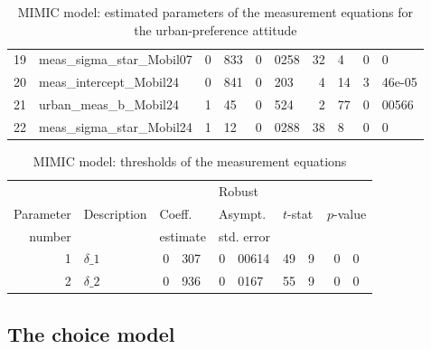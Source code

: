 \documentclass[12pt,a4paper]{article}
\begin{document}
\begin{table}[htb]
\begin{center}
\begin{tabular}{rlr@{.}lr@{.}lr@{.}lr@{.}l}
19 & meas\_sigma\_star\_Mobil07 & 0&833 & 0&0258 & 32&4 & 0&0 \\ 
20 & meas\_intercept\_Mobil24 & 0&841 & 0&203 & 4&14 & 3&46e-05 \\ 
21 & urban\_meas\_b\_Mobil24 & 1&45 & 0&524 & 2&77 & 0&00566 \\ 
22 & meas\_sigma\_star\_Mobil24 & 1&12 & 0&0288 & 38&8 & 0&0 \\ 
\end{tabular}
  \caption{MIMIC model: estimated parameters of the measurement equations for the urban-preference attitude\label{tab:mimic_params_urban_meas}}
  \end{center}
\end{table}

\begin{table}[htb]
    \footnotesize
  \begin{center}
\begin{tabular}{rlr@{.}lr@{.}lr@{.}lr@{.}l}
  &              &   \multicolumn{2}{l}{}         & \multicolumn{2}{l}{Robust}  &  \multicolumn{4}{l}{}  \\
  Parameter & Description & \multicolumn{2}{l}{Coeff.} & \multicolumn{2}{l}{Asympt.} & \multicolumn{2}{l}{$t$-stat} & \multicolumn{2}{l}{$p$-value} \\
  number    &             & \multicolumn{2}{l}{estimate} & \multicolumn{2}{l}{std. error} & \multicolumn{2}{l}{} & \multicolumn{2}{l}{} \\
  \hline
  1 & $\delta\_1$ & 0&307 & 0&00614 & 49&9 & 0&0 \\ 
2 & $\delta\_2$ & 0&936 & 0&0167 & 55&9 & 0&0 \\ 

\end{tabular}
  \caption{MIMIC model: thresholds of the measurement equations\label{tab:mimic_thresholds}}
  \end{center}
\end{table}

\clearpage
\subsection{The choice model}
\end{document}

